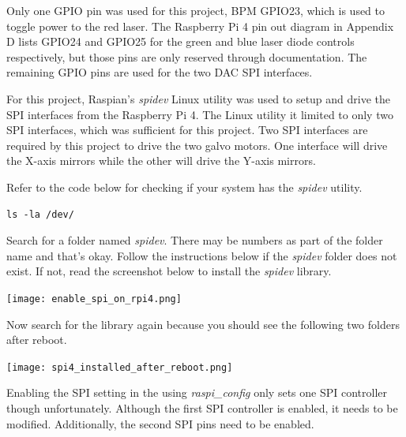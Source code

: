 \documentclass[journal]{IEEEtran}
\begin{document}
    Only one GPIO pin was used for this project, BPM GPIO23, which is used to toggle power to the red laser.
    The Raspberry Pi 4 pin out diagram in Appendix D lists GPIO24 and GPIO25 for the green and blue laser diode controls respectively, but those pins are only reserved through documentation.
    The remaining GPIO pins are used for the two DAC SPI interfaces.

    For this project, Raspian's \emph{spidev} Linux utility was used to setup and drive the SPI interfaces from the Raspberry Pi 4. 
    The Linux utility it limited to only two SPI interfaces, which was sufficient for this project.
    Two SPI interfaces are required by this project to drive the two galvo motors.
    One interface will drive the X-axis mirrors while the other will drive the Y-axis mirrors.
    
    Refer to the code below for checking if your system has the \emph{spidev} utility.

    \begin{lstlisting}[frame=single, basicstyle=\ttfamily\footnotesize, breaklines=true]
        ls -la /dev/
    \end{lstlisting}

    Search for a folder named \emph{spidev}.
    There may be numbers as part of the folder name and that's okay.
    Follow the instructions below if the \emph{spidev} folder does not exist.
    If not, read the screenshot below to install the \emph{spidev} library.

    \texttt{[image: enable\_spi\_on\_rpi4.png]}

    Now search for the library again because you should see the following two folders after reboot.

    \texttt{[image: spi4\_installed\_after\_reboot.png]}

    Enabling the SPI setting in the using \emph{raspi\_config} only sets one SPI controller though unfortunately. 
    Although the first SPI controller is enabled, it needs to be modified.
    Additionally, the second SPI pins need to be enabled.
    
\end{document}
